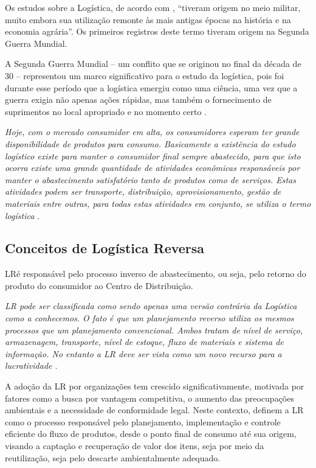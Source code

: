 Os estudos sobre a Logística, de acordo com , ``tiveram origem no meio militar, muito embora sua utilização remonte às mais antigas épocas na história e na economia agrária''. Os primeiros registros deste termo tiveram origem na Segunda Guerra Mundial.

A Segunda Guerra Mundial – um conflito que se originou no final da década de 30 – representou um marco significativo para o estudo da logística, pois foi durante esse período que a logística emergiu como uma ciência, uma vez que a guerra exigia não apenas ações rápidas, mas também o fornecimento de suprimentos no local apropriado e no momento certo \cite{paura2016fundamentos}.

\begin{citacao}
\textit{ Hoje, com o mercado consumidor em alta, os consumidores esperam ter grande disponibilidade de produtos para consumo. Basicamente a existência do estudo logístico existe para manter o consumidor final sempre abastecido, para que isto ocorra existe uma grande quantidade de atividades econômicas responsáveis por manter o abastecimento satisfatório tanto de produtos como de serviços. Estas atividades podem ser transporte, distribuição, aprovisionamento, gestão de materiais entre outras, para todas estas atividades em conjunto, se utiliza o termo logística \cite{costa2010logistica}}.
\end{citacao}

\subsection{Conceitos de Logística Reversa}\label{Conceitos Fundamentais de Logística Reversa}
 LRé responsável pelo processo inverso de abastecimento, ou seja, pelo retorno do produto do consumidor ao Centro de Distribuição.

\begin{citacao}
\textit{LR pode ser classificada como sendo apenas uma versão contrária da Logística como a conhecemos. O fato é que um planejamento reverso utiliza os mesmos processos que um planejamento convencional. Ambos tratam de nível de serviço, armazenagem, transporte, nível de estoque, fluxo de materiais e sistema de informação. No entanto a LR deve ser vista como um novo recurso para a lucratividade \cite{mueller2005logistica}}.
\end{citacao}

A adoção da LR por organizações tem crescido significativamente, motivada por fatores como a busca por vantagem competitiva, o aumento das preocupações ambientais e a necessidade de conformidade legal. Neste contexto,  definem a LR como o processo responsável pelo planejamento, implementação e controle eficiente do fluxo de produtos, desde o ponto final de consumo até sua origem, visando a captação e recuperação de valor dos itens, seja por meio da reutilização, seja pelo descarte ambientalmente adequado. 


